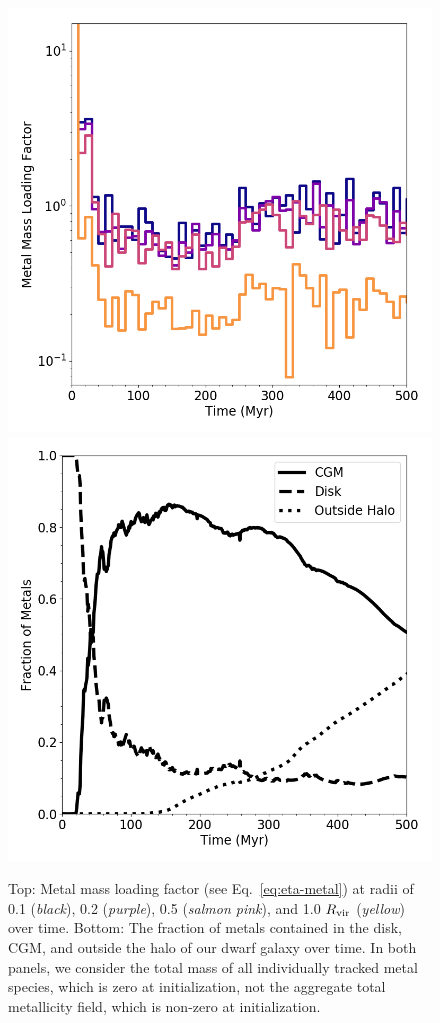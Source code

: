 \documentclass[twocolumn]{aastex61}
\begin{document}
\begin{figure}
\centering
\includegraphics[width=0.9\linewidth]{metal_mass_loading} \\
\includegraphics[width=0.9\linewidth]{metal_fraction_evolution}
\caption{Top: Metal mass loading factor (see Eq.~\ref{eq:eta-metal}) at radii of 0.1 ({\em black}), 0.2 ({\em purple}), 0.5 ({\em salmon pink}), and 1.0 $R_{\rm vir}$ ({\em yellow}) over time. Bottom: The fraction of metals contained in the disk, CGM, and outside the halo of our dwarf galaxy over time. In both panels, we consider the total mass of all individually tracked metal species, which is zero at initialization, not the aggregate total metallicity field, which is non-zero at initialization.}
\label{fig:metal_evolution}
\end{figure}
\end{document}
